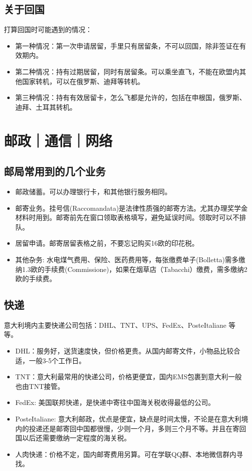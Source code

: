 \subsection{关于回国}
打算回国时可能遇到的情况：
\begin{itemize}
\item 第一种情况：第一次申请居留，手里只有居留条，不可以回国，除非签证在有效期内。
\item 第二种情况：持有过期居留，同时有居留条。可以乘坐直飞，不能在欧盟内其他国家转机，可以在俄罗斯、迪拜等转机。
\item 第三种情况：持有有效居留卡，怎么飞都是允许的，包括在申根国，俄罗斯、迪拜、土耳其转机。
\end{itemize}

\section{邮政｜通信｜网络}

\subsection{邮局常用到的几个业务}
\begin{itemize}
\item 邮政储蓄。可以办理银行卡，和其他银行服务相同。
\item 邮寄业务。挂号信(Raccomandata)是法律性质强的邮寄方法。尤其办理奖学金材料时用到。邮寄前先在窗口领取表格填写，避免延误时间。领取时可以不排队。
\item 居留申请。邮寄居留表格之前，不要忘记购买16欧的印花税。
\item 其他杂务: 水电煤气费用、保险、医药费用等，每张缴费单子(Bolletta)需多缴纳1.3欧的手续费(Commissione)，如果在烟草店（Tabacchi）缴费，需多缴纳2欧的手续费。

\end{itemize}

\subsection{快递}
意大利境内主要快递公司包括：DHL、TNT、UPS、FedEx、PosteItaliane 等等。
\begin{itemize}
\item DHL：服务好，送货速度快，但价格更贵。从国内邮寄文件，小物品比较合适，一般3-5个工作日。
\item TNT：意大利最常用的快递公司，价格更便宜，国内EMS包裹到意大利一般也由TNT接管。
\item FedEx: 美国联邦快递，是快递中寄往中国海关税收得最低的公司。
\item PosteItaliane: 意大利邮政，优点是便宜，缺点是时间太慢，不论是在意大利境内的投递还是邮寄回中国都很慢，少则一个月，多则三个月不等。并且在寄回国以后还需要缴纳一定程度的海关税。
\item 人肉快递：价格不定，国内邮寄费用另算。可在学联QQ群、本地微信群内寻找。
\end{itemize}

